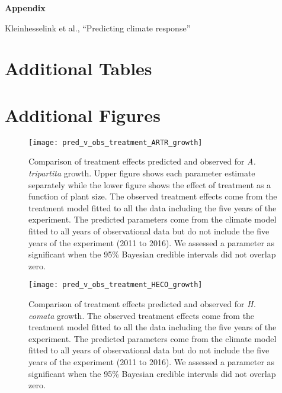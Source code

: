 \documentclass[11pt]{article}
\begin{document}
\clearpage 
\newpage 



\clearpage 
\newpage 

\setcounter{page}{1}
\setcounter{equation}{0}
\setcounter{figure}{0}
\setcounter{section}{0}
\setcounter{table}{0}
\renewcommand{\theequation}{A.\arabic{equation}}
\renewcommand{\thetable}{A-\arabic{table}}
\renewcommand{\thefigure}{A-\arabic{figure}}
\renewcommand{\thesection}{Section A.\arabic{section}}

\centerline{\Large \textbf{Appendix}}
\centerline{Kleinhesselink et al., ``Predicting climate response''} 

\vspace{0.4in} 

\section{Additional Tables} \label{appendix}




\clearpage
\newpage

\section{Additional Figures} 

\begin{figure}[!htbp]
	\centering
	\texttt{[image: pred\_v\_obs\_treatment\_ARTR\_growth]}
	\caption{Comparison of treatment effects predicted and observed for \textit{A. tripartita} growth.  Upper figure shows each parameter estimate separately while the lower figure shows the effect of treatment as a function of plant size.  The observed treatment effects come from the treatment model fitted to all the data including the five years of the experiment.  The predicted parameters come from the climate model fitted to all years of observational data but do not include the five years of the experiment (2011 to 2016). We assessed a parameter as significant when the 95\% Bayesian credible intervals did not overlap zero.}
	\label{fig:parPredARTRGrowth}
\end{figure}

\begin{figure}[!htbp]
	\centering
	\texttt{[image: pred\_v\_obs\_treatment\_HECO\_growth]}
	\caption{Comparison of treatment effects predicted and observed for \textit{H. comata} growth.  The observed treatment effects come from the treatment model fitted to all the data including the five years of the experiment.  The predicted parameters come from the climate model fitted to all years of observational data but do not include the five years of the experiment (2011 to 2016). We assessed a parameter as significant when the 95\% Bayesian credible intervals did not overlap zero.}
	\label{fig:parPredHECOGrowth}
\end{figure}
\end{document}
